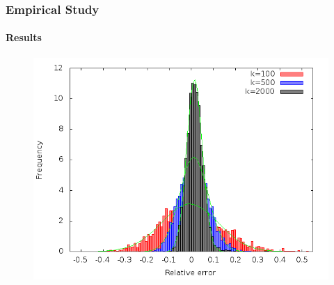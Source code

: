 \documentclass{beamer}
\begin{document}
\begin{frame}
\frametitle{Empirical Study}
\framesubtitle{Results}
  		\begin{figure}
		\includegraphics[scale=0.46]{histogramAll.png}
	\end{figure}
\end{frame} 
\end{document}
